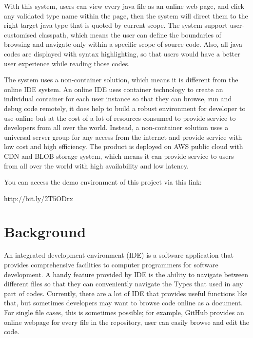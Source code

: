 \documentclass[runningheads]{llncs}
\begin{document}
With this system, users can view every java file as an online web page, and click any validated type name within the page, then the system will direct them to the right target java type that is quoted by current scope.
The system support user-customised classpath, which means the user can define the boundaries of browsing and navigate only within a specific scope of source code. Also, all java codes are displayed with syntax highlighting, so that users would have a better user experience while reading those codes.

The system uses a non-container solution, which means it is different from the online IDE system. An online IDE uses container technology to create an individual container for each user instance so that they can browse, run and debug code remotely, it does help to build a robust environment for developer to use online but at the cost of a lot of resources consumed to provide service to developers from all over the world. Instead, a non-container solution uses a universal server group for any access from the internet and provide service with low cost and high efficiency.
The product is deployed on AWS public cloud with CDN\cite{Content_delivery_network} and BLOB\cite{Binary_large_object} storage system, which means it can provide service to users from all over the world with high availability and low latency.

You can access the demo environment of this project via this link: 

http://bit.ly/2T5ODrx


\section{Background}

An integrated development environment (IDE) is a software application that provides comprehensive facilities to computer programmers for software development\cite{Ide_introduction}. A handy feature provided by IDE is the ability to navigate between different files so that they can conveniently navigate the Types that used in any part of codes. Currently, there are a lot of IDE that provides useful functions like that, but sometimes developers may want to browse code online as a document. For single file cases, this is sometimes possible; for example, GitHub\cite{GitHub} provides an online webpage for every file in the repository, user can easily browse and edit the code. 
\end{document}
